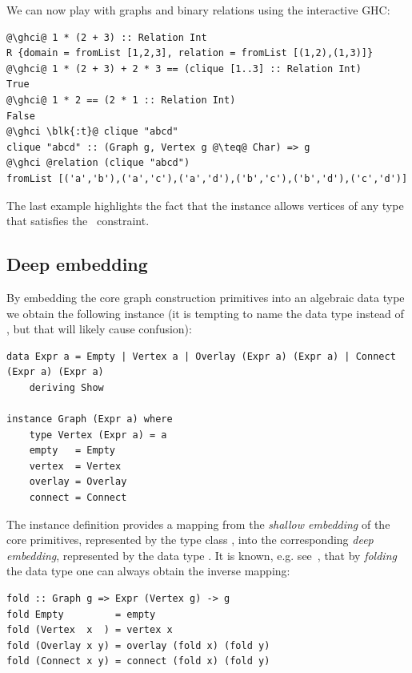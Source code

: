 We can now play with graphs and binary relations using the interactive GHC:

\begin{verbatim}
@\ghci@ 1 * (2 + 3) :: Relation Int
R {domain = fromList [1,2,3], relation = fromList [(1,2),(1,3)]}
@\ghci@ 1 * (2 + 3) + 2 * 3 == (clique [1..3] :: Relation Int)
True
@\ghci@ 1 * 2 == (2 * 1 :: Relation Int)
False
@\ghci \blk{:t}@ clique "abcd"
clique "abcd" :: (Graph g, Vertex g @\teq@ Char) => g
@\ghci @relation (clique "abcd")
fromList [('a','b'),('a','c'),('a','d'),('b','c'),('b','d'),('c','d')]
\end{verbatim}

\noindent
The last example highlights the fact that the  instance allows vertices
of any type  that satisfies the~ constraint.

\subsection{Deep embedding}\label{sub-embedding}

By embedding the core graph construction primitives into an algebraic data type 
we obtain the following  instance (it is tempting to name the data type
 instead of , but that will likely cause confusion):

\begin{verbatim}
data Expr a = Empty | Vertex a | Overlay (Expr a) (Expr a) | Connect (Expr a) (Expr a)
    deriving Show

instance Graph (Expr a) where
    type Vertex (Expr a) = a
    empty   = Empty
    vertex  = Vertex
    overlay = Overlay
    connect = Connect
\end{verbatim}

The instance definition provides a mapping from the \emph{shallow embedding}
of the core primitives, represented by the type class , into the
corresponding \emph{deep embedding}, represented by the data type .
It is known, e.g. see~\citet{2014_gibbons_folding}, that by \emph{folding} the data
type one can always obtain the inverse mapping:

\begin{verbatim}
fold :: Graph g => Expr (Vertex g) -> g
fold Empty         = empty
fold (Vertex  x  ) = vertex x
fold (Overlay x y) = overlay (fold x) (fold y)
fold (Connect x y) = connect (fold x) (fold y)
\end{verbatim}

